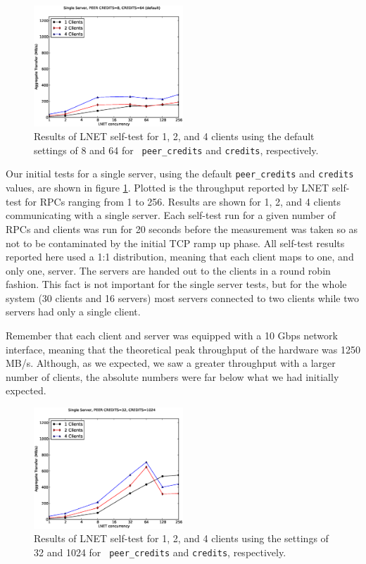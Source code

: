 \documentclass[]{sigplan-proc}
\begin{document}
\begin{figure}
\centering
\includegraphics[width=0.50\textwidth]{figures/default_pc_plot.eps}
\caption{Results of LNET self-test for 1, 2, and 4 clients using the default settings of 8 and 64 for {\tt
    peer\_credits} and {\tt credits}, respectively.}
\label{fig:default}
\end{figure}

Our initial tests for a single server, using the default {\tt peer\_credits} and {\tt credits} values, are
shown in figure \ref{fig:default}. Plotted is the throughput reported by LNET self-test for RPCs ranging from
1 to 256. Results are shown for 1, 2, and 4 clients communicating with a single server. Each self-test run for
a given number of RPCs and clients was run for 20 seconds before the measurement was taken so as not to be
contaminated by the initial TCP ramp up phase. All self-test results reported here used a 1:1 distribution,
meaning that each client maps to one, and only one, server. The servers are handed out to the clients in a
round robin fashion. This fact is not important for the single server tests, but for the whole system (30
clients and 16 servers) most servers connected to two clients while two servers had only a single client.

Remember that each client and server was equipped with a 10 Gbps network interface, meaning that the
theoretical peak throughput of the hardware was 1250 MB/s. Although, as we expected, we saw a greater
throughput with a larger number of clients, the absolute numbers were far below what we had initially
expected.

\begin{figure}
\centering
\includegraphics[width=0.50\textwidth]{figures/32pc_plot.eps}
\caption{Results of LNET self-test for 1, 2, and 4 clients using the settings of 32 and 1024 for {\tt
    peer\_credits} and {\tt credits}, respectively.}
\label{fig:32pc}
\end{figure}
\end{document}
